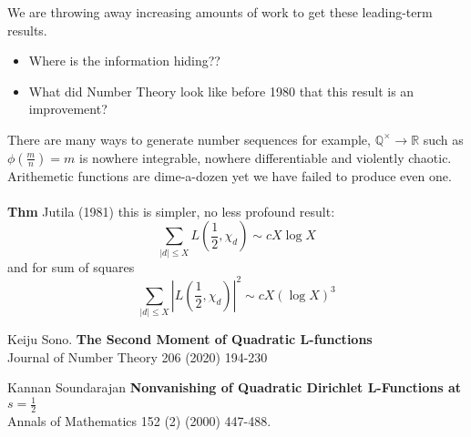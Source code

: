 \documentclass[12pt]{article}
\begin{document}
We are throwing away increasing amounts of work to get these leading-term results. 
\begin{itemize}
\item Where is the information hiding??
\item What did Number Theory look like before 1980 that this result is an improvement?
\end{itemize}
There are many ways to generate number sequences for example, $\mathbb{Q}^\times \to \mathbb{R}$ such as $\phi(\frac{m}{n}) = m$ is nowhere integrable, nowhere differentiable and violently chaotic.  Arithemetic functions are dime-a-dozen yet we have failed to produce even one. \\ \\
\textbf{Thm} Jutila (1981) this is simpler, no less profound result:
$$ \sum_{|d| \leq X} L(\frac{1}{2}, \chi_d) \sim c X \log X $$
and for sum of squares
$$ \sum_{|d| \leq X} |L(\frac{1}{2}, \chi_d)|^2 \sim c X (\log X)^3 $$
\vfill



\begin{thebibliography}{}
\item Keiju Sono.  \textbf{The Second Moment of Quadratic L-functions} \\ Journal of Number Theory 206 (2020) 194-230
\item Kannan Soundarajan \textbf{
Nonvanishing of Quadratic Dirichlet L-Functions at $s = \frac{1}{2}$} \\ Annals of Mathematics 152 (2) (2000) 447-488.
\end{thebibliography}
\end{document}
